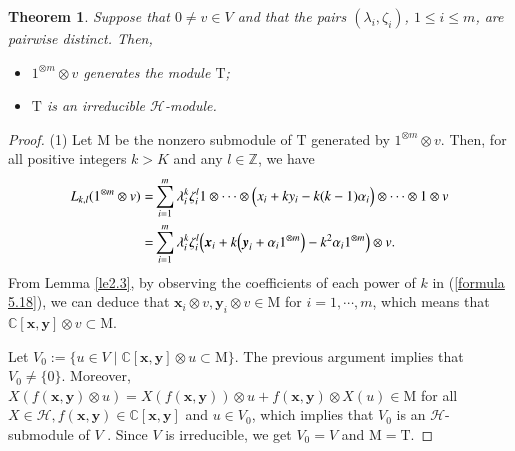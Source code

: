 \documentclass[12pt,reqno]{amsart}
\def\Z{\mathbb{Z}}
\def\N{\mathbb{N}}
\def\C{\mathbb{C}}
\numberwithin{equation}{section}
\newtheorem{theo}{Theorem}[section]
\begin{document}
\begin{theo}\label{th5.1}
 Suppose that $0\neq v\in V$ and that the pairs $(\lambda_i,\zeta_i)$, $1\le i \le m$, are pairwise distinct. Then,
 \begin{itemize}
\item[\rm(1)]$1^{\otimes m}\otimes v$ generates the module $\mathrm{T}$;
\item[\rm(2)] $\mathrm{T}$ is an irreducible $\mathcal{H}$-module.
\end{itemize}
\end{theo}
\begin{proof}
    \rm(1) Let $\mathrm{M}$ be the nonzero submodule of $\mathrm{T}$ generated by $1^{\otimes m}\otimes v$. Then, for all positive integers $k>K$ and any $l\in\Z$, we have
\begin{equation}\label{formula 5.18}
\aligned
L_{k,l}(1^{\otimes m}\otimes v)
=&\sum_{i=1}^m\lambda_i^k\zeta_i^l1\otimes\dots \otimes\Big(x_i+ky_i-k(k-1)\alpha_i\Big)\otimes\dots \otimes 1\otimes v\\
=&\sum_{i=1}^m\lambda_i^k\zeta_i^l\Big(\boldsymbol{x}_i+k\Big(\boldsymbol{y}_i+\alpha_i1^{\otimes m}\Big)-k^2\alpha_i1^{\otimes m}
\Big)\otimes v.
\endaligned 
\end{equation}
From Lemma \ref{le2.3}, by observing the coefficients of each power of $k$ in (\ref{formula 5.18}), we can deduce that $\boldsymbol{x}_i\otimes v,\boldsymbol{y}_i\otimes v\in \mathrm{M}$ for $i=1,\cdots, m$, which means that $\C[\boldsymbol{x},\boldsymbol{y}]\otimes v\subset \mathrm{M}$.

Let $V_0 := \{u \in V \mid \C[\boldsymbol{x},\boldsymbol{y}] \otimes u \subset \mathrm{M}\}$. The previous argument implies
that $V_0 \neq \{0\}$. Moreover, $X(f(\boldsymbol{x},\boldsymbol{y})\otimes u)=X(f(\boldsymbol{x},\boldsymbol{y}))\otimes u+f(\boldsymbol{x},\boldsymbol{y})\otimes X(u)\in \mathrm{M}$ for all $X\in\mathcal{H},f(\boldsymbol{x},\boldsymbol{y})\in\C[\boldsymbol{x},\boldsymbol{y}]$ and $u\in V_0$, which implies that $V_0$ is an $\mathcal{H}$-submodule of $V$ . Since $V$ is irreducible, we get $V_0=V$ and $\mathrm{M}=\mathrm{T}$.


\end{proof}
\end{document}
